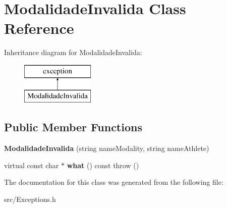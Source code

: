 \hypertarget{class_modalidade_invalida}{}\section{Modalidade\+Invalida Class Reference}
\label{class_modalidade_invalida}
Inheritance diagram for Modalidade\+Invalida\+:\begin{figure}[H]
\begin{center}
\leavevmode
\includegraphics[height=2.000000cm]{class_modalidade_invalida}
\end{center}
\end{figure}
\subsection*{Public Member Functions}
\begin{DoxyCompactItemize}
\item 
\hypertarget{class_modalidade_invalida_a492e5df10a001077615a60d6a951bb70}{}{\bfseries Modalidade\+Invalida} (string name\+Modality, string name\+Athlete)\label{class_modalidade_invalida_a492e5df10a001077615a60d6a951bb70}

\item 
\hypertarget{class_modalidade_invalida_aa7fb2f775a9098fc9250c943e739707c}{}virtual const char $\ast$ {\bfseries what} () const   throw ()\label{class_modalidade_invalida_aa7fb2f775a9098fc9250c943e739707c}

\end{DoxyCompactItemize}


The documentation for this class was generated from the following file\+:\begin{DoxyCompactItemize}
\item 
src/Exceptions.\+h\end{DoxyCompactItemize}
